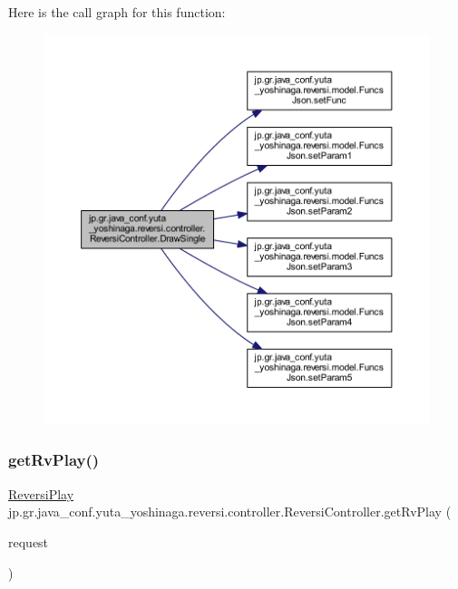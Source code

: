Here is the call graph for this function\+:
\nopagebreak
\begin{figure}[H]
\begin{center}
\leavevmode
\includegraphics[width=350pt]{classjp_1_1gr_1_1java__conf_1_1yuta__yoshinaga_1_1reversi_1_1controller_1_1_reversi_controller_a2303f5dc844932ae026ec80d6323f726_cgraph}
\end{center}
\end{figure}
\mbox{\label{classjp_1_1gr_1_1java__conf_1_1yuta__yoshinaga_1_1reversi_1_1controller_1_1_reversi_controller_ae0b09a6cc58c14296aaed1cf50ab1087}} 
\subsubsection{\texorpdfstring{get\+Rv\+Play()}{getRvPlay()}}
{\footnotesize\ttfamily \hyperlink{classjp_1_1gr_1_1java__conf_1_1yuta__yoshinaga_1_1reversi_1_1model_1_1_reversi_play}{Reversi\+Play} jp.\+gr.\+java\+\_\+conf.\+yuta\+\_\+yoshinaga.\+reversi.\+controller.\+Reversi\+Controller.\+get\+Rv\+Play (\begin{DoxyParamCaption}\item[{Http\+Servlet\+Request}]{request }\end{DoxyParamCaption})\hspace{0.3cm}{\ttfamily [private]}}



